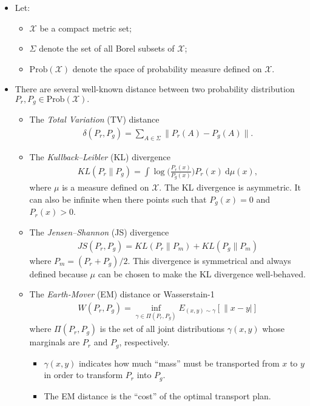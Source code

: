 \documentclass[10pt]{article}
\newcommand{\dee}{\mathrm{d}}
\begin{document}
  \begin{itemize}
  	\item Let:
  	\begin{itemize}
  		\item $\mathcal{X}$ be a compact metric set;
  		\item $\Sigma$ denote the set of all Borel subsets of $\mathcal{X}$;
  		\item $\mathrm{Prob}(\mathcal{X})$ denote the space of probability measure defined on $\mathcal{X}$.
  	\end{itemize}

  	\item There are several well-known distance between two probability distribution $P_r, P_g \in \mathrm{Prob}(\mathcal{X}).$ 

  	\begin{itemize}
  		\item The \emph{Total Variation} (TV) distance
  		\begin{align*}
  			\delta(P_r, P_g) = \sum_{A \in \Sigma} \| P_r(A) - P_g(A) \|.
  		\end{align*}
  		
  		\item The \emph{Kullback--Leibler} (KL) divergence
  		\begin{align*}
  			KL(P_r\|P_g) = \int \log\bigg( \frac{P_r(x)}{P_g(x)} \bigg) P_r(x)\ \dee\mu(x),
  		\end{align*}
  		where $\mu$ is a measure defined on $\mathcal{X}$. The KL divergence is asymmetric. It can also be infinite when there points such that $P_g(x) = 0$ and $P_r(x) > 0$.

  		\item The \emph{Jensen--Shannon} (JS) divergence
  		\begin{align*}
  			JS(P_r,P_g) = KL(P_r\|P_m) + KL(P_g\|P_m)
  		\end{align*}
  		where $P_m = (P_r + P_g)/2$. This divergence is symmetrical and always defined because $\mu$ can be chosen to make the KL divergence well-behaved.

  		\item The \emph{Earth-Mover} (EM) distance or Wasserstain-1
  		\begin{align*}
  			W(P_r, P_g) = \inf_{\gamma \in \Pi(P_r, P_g)} E_{(x,y)\sim\gamma} [ \| x - y|]
  		\end{align*}
  		where $\Pi(P_r, P_g)$ is the set of all joint distributions $\gamma(x,y)$ whose marginals are $P_r$ and $P_g$, respectively.
  		\begin{itemize}
  			\item  $\gamma(x,y)$ indicates how much ``mass'' must be transported from $x$ to $y$ in order to transform $P_r$ into $P_g$.
  			\item The EM distance is the ``cost'' of the optimal transport plan.
  		\end{itemize}
  	\end{itemize}


\end{itemize}
\end{document}
